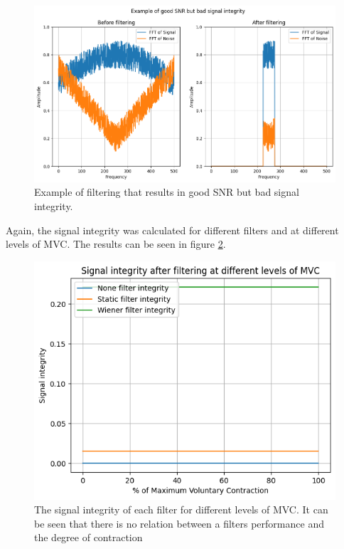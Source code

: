 \begin{figure}[h!t]
	\begin{center}
		\includegraphics[width=1.0\columnwidth]{images/good_snr_bad_integrity.png}
	\end{center}
	\caption{Example of filtering that results in good SNR but bad signal integrity.}
	\label{fig:good_snr_bad_integrity}
\end{figure}

Again, the signal integrity was calculated for different filters and at different levels of MVC. The results can be seen in figure \ref{fig:filter_signal_integrity_mvc}.

\begin{figure}[h!t]
	\begin{center}
		\includegraphics[width=1.0\columnwidth]{images/filter_signal_integrity_mvc.png}
	\end{center}
	\caption{The signal integrity of each filter for different levels of MVC. It can be seen that there is no relation between a filters performance and the degree of contraction}
	\label{fig:filter_signal_integrity_mvc}
\end{figure}

